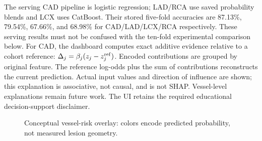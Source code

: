 \documentclass[9pt,twocolumn]{article}
\begin{document}
The serving CAD pipeline is logistic regression; LAD/RCA use saved probability blends and LCX uses CatBoost. Their stored five-fold accuracies are 87.13\%, 79.54\%, 67.66\%, and 68.98\% for CAD/LAD/LCX/RCA respectively. These serving results must not be confused with the ten-fold experimental comparison below. For CAD, the dashboard computes exact additive evidence relative to a cohort reference: $\Delta_j=\beta_j(z_j-z_j^{\rm ref})$. Encoded contributions are grouped by original feature. The reference log-odds plus the sum of contributions reconstructs the current prediction. Actual input values and direction of influence are shown; this explanation is associative, not causal, and is not SHAP. Vessel-level explanations remain future work. The UI retains the required educational decision-support disclaimer.
\begin{figure}[t]\centering
{}
\caption{Conceptual vessel-risk overlay: colors encode predicted probability, not measured lesion geometry.}
\end{figure}
\end{document}

